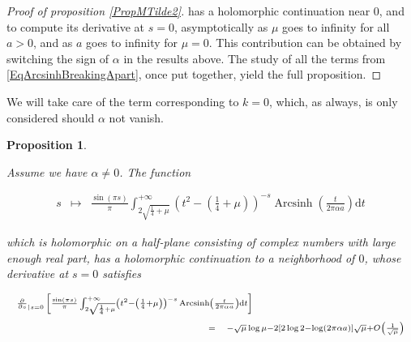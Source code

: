 \documentclass{jams-l}
\newtheorem{proposition}[theorem]{Proposition}
\theoremstyle{definition}
\theoremstyle{remark}
\numberwithin{equation}{section}
\DeclareMathOperator{\arcsinh}{Arcsinh}
\begin{document}
\begin{proof}[Proof of proposition \ref{PropMTilde2}]
                        \noindent has a holomorphic continuation near $0$, and to compute its derivative at $s=0$, asymptotically as $\mu$ goes to infinity for all $a > 0$, and as $a$ goes to infinity for $\mu = 0$. This contribution can be obtained by switching the sign of $\alpha$ in the results above. The study of all the terms from \eqref{EqArcsinhBreakingApart}, once put together, yield the full proposition.
                    
                \end{proof}
                
                We will take care of the term corresponding to $k=0$, which, as always, is only considered should $\alpha$ not vanish.
                
                \begin{proposition}
                \label{PropMTilde2-0}
                
                    Assume we have $\alpha \neq 0$. The function
                    
                    \[ \begin{array}{lll}
                            s & \longmapsto & \frac{\sin \left( \pi s \right)}{\pi} \int_{2 \sqrt{\frac{1}{4} + \mu}}^{+ \infty} \left( t^2 - \left( \frac{1}{4} + \mu \right) \right)^{-s} \arcsinh \left( \frac{t}{2 \pi \alpha a} \right) \mathrm{d}t
                        \end{array} \]
                    
                    \noindent which is holomorphic on a half-plane consisting of complex numbers with large enough real part, has a holomorphic continuation to a neighborhood of $0$, whose derivative at $s=0$ satisfies
                    
                    \[ \begin{array}{lll}
                            \multicolumn{3}{l}{\scriptstyle \frac{\partial}{\partial s}_{\left \vert s = 0 \right.} \left[ \frac{\sin \left( \pi s \right)}{\pi} \int_{2 \sqrt{\frac{1}{4} + \mu}}^{+ \infty} \left( t^2 - \left( \frac{1}{4} + \mu \right) \right)^{-s} \arcsinh \left( \frac{t}{2 \pi \alpha a} \right) \mathrm{d}t \right]} \\[1em]
                            
                            \qquad \qquad \qquad \qquad \qquad \qquad \qquad \qquad & \scriptstyle = & \scriptstyle - \sqrt{\mu} \log \mu - 2 \left[ 2 \log 2 - \log \left( 2 \pi \alpha a \right) \right] \sqrt{\mu} + O \left( \frac{1}{\sqrt{\mu}} \right)
                        \end{array} \]
                    

\end{proposition}
\end{document}
